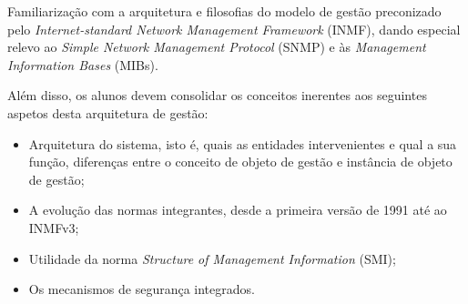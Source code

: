 \documentclass[../momento_1.tex]{subfiles}
\begin{document}
\par Familiarização com a arquitetura e filosofias do modelo de gestão preconizado pelo
\textit{Internet-standard Network Management Framework} (INMF), dando especial relevo ao \textit{Simple
Network Management Protocol} (SNMP) e às \textit{Management Information Bases} (MIBs).
\par Além disso, os alunos devem consolidar os conceitos inerentes aos seguintes aspetos desta
arquitetura de gestão:
\begin{itemize}
\item Arquitetura do sistema, isto é, quais as entidades intervenientes e qual a sua função,
diferenças entre o conceito de objeto de gestão e instância de objeto de gestão;
\item A evolução das normas integrantes, desde a primeira versão de 1991 até ao INMFv3;
\item Utilidade da norma \textit{Structure of Management Information} (SMI);
\item Os mecanismos de segurança integrados.
\end{itemize}
\end{document}

